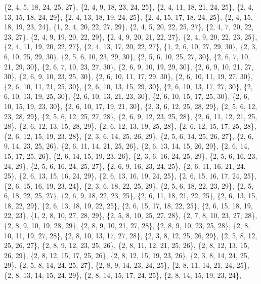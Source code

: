 \documentclass[11pt,a4paper]{article}
\begin{document}
{\{2, 4, 5, 18, 24, 25, 27\}, \{2, 4, 9, 18, 23, 24, 25\}, \{2, 4, 11, 18, 21, 24, 25\}, \{2, 4, 13, 15, 18, 24, 29\}, \{2, 4, 13, 18, 19, 24, 25\},
\{2, 4, 15, 17, 18, 24, 25\}, \{2, 4, 15, 18, 19, 23, 24\}, \{1, 2, 4, 20, 22, 27, 29\}, \{2, 4, 5, 20, 22, 25, 27\}, \{2, 4, 7, 20, 22, 23, 27\},
\{2, 4, 9, 19, 20, 22, 29\}, \{2, 4, 9, 20, 21, 22, 27\}, \{2, 4, 9, 20, 22, 23, 25\}, \{2, 4, 11, 19, 20, 22, 27\}, \{2, 4, 13, 17, 20, 22, 27\},
\{1, 2, 6, 10, 27, 29, 30\}, \{2, 3, 6, 10, 25, 29, 30\}, \{2, 5, 6, 10, 23, 29, 30\}, \{2, 5, 6, 10, 25, 27, 30\}, \{2, 6, 7, 10, 21, 29, 30\},
\{2, 6, 7, 10, 23, 27, 30\}, \{2, 6, 9, 10, 19, 29, 30\}, \{2, 6, 9, 10, 21, 27, 30\}, \{2, 6, 9, 10, 23, 25, 30\}, \{2, 6, 10, 11, 17, 29, 30\},
\{2, 6, 10, 11, 19, 27, 30\}, \{2, 6, 10, 11, 21, 25, 30\}, \{2, 6, 10, 13, 15, 29, 30\}, \{2, 6, 10, 13, 17, 27, 30\}, \{2, 6, 10, 13, 19, 25, 30\},
\{2, 6, 10, 13, 21, 23, 30\}, \{2, 6, 10, 15, 17, 25, 30\}, \{2, 6, 10, 15, 19, 23, 30\}, \{2, 6, 10, 17, 19, 21, 30\}, \{2, 3, 6, 12, 25, 28, 29\},
\{2, 5, 6, 12, 23, 28, 29\}, \{2, 5, 6, 12, 25, 27, 28\}, \{2, 6, 9, 12, 23, 25, 28\}, \{2, 6, 11, 12, 21, 25, 28\}, \{2, 6, 12, 13, 15, 28, 29\},
\{2, 6, 12, 13, 19, 25, 28\}, \{2, 6, 12, 15, 17, 25, 28\}, \{2, 6, 12, 15, 19, 23, 28\}, \{2, 3, 6, 14, 25, 26, 29\}, \{2, 5, 6, 14, 25, 26, 27\},
\{2, 6, 9, 14, 23, 25, 26\}, \{2, 6, 11, 14, 21, 25, 26\}, \{2, 6, 13, 14, 15, 26, 29\}, \{2, 6, 14, 15, 17, 25, 26\}, \{2, 6, 14, 15, 19, 23, 26\},
\{2, 3, 6, 16, 24, 25, 29\}, \{2, 5, 6, 16, 23, 24, 29\}, \{2, 5, 6, 16, 24, 25, 27\}, \{2, 6, 9, 16, 23, 24, 25\}, \{2, 6, 11, 16, 21, 24, 25\},
\{2, 6, 13, 15, 16, 24, 29\}, \{2, 6, 13, 16, 19, 24, 25\}, \{2, 6, 15, 16, 17, 24, 25\}, \{2, 6, 15, 16, 19, 23, 24\}, \{2, 3, 6, 18, 22, 25, 29\},
\{2, 5, 6, 18, 22, 23, 29\}, \{2, 5, 6, 18, 22, 25, 27\}, \{2, 6, 9, 18, 22, 23, 25\}, \{2, 6, 11, 18, 21, 22, 25\}, \{2, 6, 13, 15, 18, 22, 29\},
\{2, 6, 13, 18, 19, 22, 25\}, \{2, 6, 15, 17, 18, 22, 25\}, \{2, 6, 15, 18, 19, 22, 23\}, \{1, 2, 8, 10, 27, 28, 29\}, \{2, 5, 8, 10, 25, 27, 28\},
\{2, 7, 8, 10, 23, 27, 28\}, \{2, 8, 9, 10, 19, 28, 29\}, \{2, 8, 9, 10, 21, 27, 28\}, \{2, 8, 9, 10, 23, 25, 28\}, \{2, 8, 10, 11, 19, 27, 28\},
\{2, 8, 10, 13, 17, 27, 28\}, \{2, 3, 8, 12, 25, 26, 29\}, \{2, 5, 8, 12, 25, 26, 27\}, \{2, 8, 9, 12, 23, 25, 26\}, \{2, 8, 11, 12, 21, 25, 26\},
\{2, 8, 12, 13, 15, 26, 29\}, \{2, 8, 12, 15, 17, 25, 26\}, \{2, 8, 12, 15, 19, 23, 26\}, \{2, 3, 8, 14, 24, 25, 29\}, \{2, 5, 8, 14, 24, 25, 27\},
\{2, 8, 9, 14, 23, 24, 25\}, \{2, 8, 11, 14, 21, 24, 25\}, \{2, 8, 13, 14, 15, 24, 29\}, \{2, 8, 14, 15, 17, 24, 25\}, \{2, 8, 14, 15, 19, 23, 24\},
}
\end{document}
